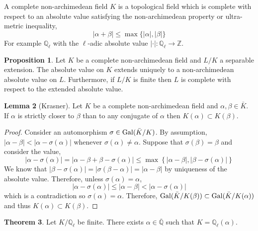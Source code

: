 \documentclass[12pt]{article}
\newcommand{\Z}{\mathbb{Z}}
\newcommand{\Q}{\mathbb{Q}}
\newcommand{\Gal}[1]{\mathrm{Gal} \small(#1 \small)}
\theoremstyle{remark}
\theoremstyle{definition}
\newtheorem{theorem}{Theorem}[section]
\newtheorem{lemma}[theorem]{Lemma}
\newtheorem{proposition}[theorem]{Proposition}
\newenvironment{definition}[1][Definition:]{\begin{trivlist}
\item[\hskip \labelsep {\bfseries #1}]}{\end{trivlist}}
\begin{document}
\begin{definition}
A complete non-archimedean field $K$ is a topological field which is complete with respect to an absolute value satisfying the non-archimedean property or ultra-metric inequality,
\[ |\alpha + \beta| \le \max\{|\alpha|, |\beta|\} \]
For example $\Q_{\ell}$ with the $\ell$-adic absolute value $| \cdot | : \Q_{\ell} \to \Z$. 
\end{definition}

\begin{proposition}
Let $K$ be a complete non-archimedean field and $L / K$ a separable extension. The absolute value on $K$ extends uniquely to a non-archimedean absolute value on $L$. Furthermore, if $L / K$ is finite then $L$ is complete with respect to the extended absolute value. 
\end{proposition}

\begin{lemma}[Krasner]
Let $K$ be a complete non-archimedean field and $\alpha, \beta \in \bar{K}$. If $\alpha$ is strictly closer to $\beta$ than to any conjugate of $\alpha$ then $K(\alpha) \subset K(\beta)$.
\end{lemma}

\begin{proof}
Consider an automorphism $\sigma \in \Gal{\bar{K} / K}$. By assumption, $|\alpha - \beta | < |\alpha - \sigma(\alpha)|$ whenever $\sigma(\alpha) \neq \alpha$. Suppose that $\sigma(\beta) = \beta$ and consider the value,
\[ |\alpha - \sigma(\alpha)| = |\alpha - \beta + \beta - \sigma(\alpha) | \le \max \left\{ | \alpha - \beta |, | \beta - \sigma(\alpha)| \right\} \]
We know that $|\beta - \sigma(\alpha)| = |\sigma(\beta - \alpha)| = |\alpha - \beta|$ by uniqueness of the absolute value. Therefore, unless $\sigma(\alpha) = \alpha$,
\[ |\alpha - \sigma(\alpha)| \le |\alpha - \beta| < |\alpha - \sigma(\alpha)| \] 
which is a contradiction so $\sigma(\alpha) = \alpha$. Therefore, $\Gal{\bar{K} / K(\beta)} \subset \Gal{\bar{K} / K(\alpha)}$ and thus $K(\alpha) \subset K(\beta)$. 
\end{proof}

\begin{theorem} \label{thm:algebraic_extensions_adics}
Let $K / \Q_{\ell}$ be finite. There exists $\alpha \in \overline{\Q}$ such that $K = \Q_{\ell}(\alpha)$. 
\end{theorem}
\end{document}
